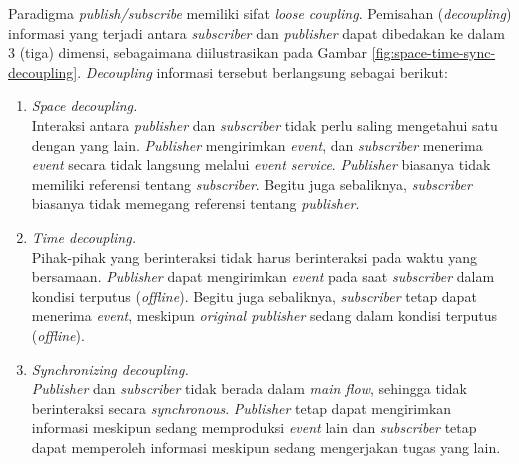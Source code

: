 Paradigma \textit{publish/subscribe} memiliki sifat \textit{loose coupling}. Pemisahan (\textit{decoupling}) informasi yang terjadi antara \textit{subscriber} dan \textit{publisher} dapat dibedakan ke dalam 3 (tiga) dimensi, sebagaimana diilustrasikan pada Gambar \ref{fig:space-time-sync-decoupling}. \textit{Decoupling} informasi tersebut berlangsung sebagai berikut:

\begin{enumerate}
\item \textit{Space decoupling.} \\
Interaksi antara \textit{publisher} dan \textit{subscriber} tidak perlu saling mengetahui satu dengan yang lain. \textit{Publisher} mengirimkan \textit{event}, dan \textit{subscriber} menerima \textit{event} secara tidak langsung melalui \textit{event service}. \textit{Publisher} biasanya tidak memiliki referensi tentang \textit{subscriber}. Begitu juga sebaliknya, \textit{subscriber} biasanya tidak memegang referensi tentang \textit{publisher}.
\item \textit{Time decoupling.} \\
Pihak-pihak yang berinteraksi tidak harus berinteraksi pada waktu yang bersamaan. \textit{Publisher} dapat mengirimkan \textit{event} pada saat \textit{subscriber} dalam kondisi terputus (\textit{offline}). Begitu juga sebaliknya, \textit{subscriber} tetap dapat menerima \textit{event}, meskipun \textit{original publisher} sedang dalam kondisi terputus (\textit{offline}).
\item \textit{Synchronizing decoupling.} \\
\textit{Publisher} dan \textit{subscriber} tidak berada dalam \textit{main flow}, sehingga tidak berinteraksi secara \textit{synchronous}. \textit{Publisher} tetap dapat mengirimkan informasi meskipun sedang memproduksi \textit{event} lain dan \textit{subscriber} tetap dapat memperoleh informasi meskipun sedang mengerjakan tugas yang lain. 
\end{enumerate}


